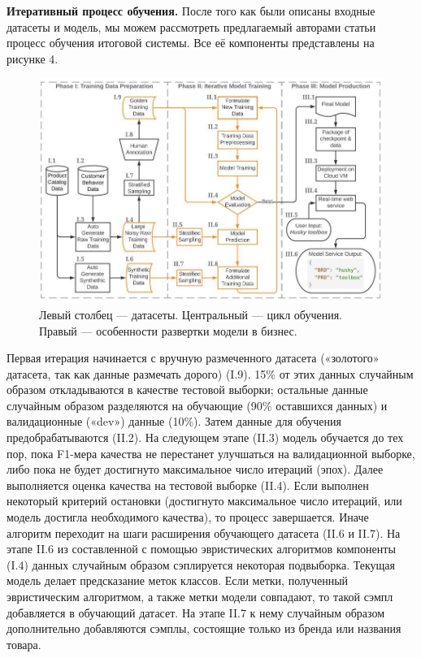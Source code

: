 \documentclass[12pt,a4paper]{article}
\begin{document}
\textbf{Итеративный процесс обучения.} После того как были описаны входные датасеты и модель, мы можем рассмотреть предлагаемый авторами статьи процесс обучения итоговой системы. Все её компоненты представлены на рисунке 4.

\begin{figure}[H]
\begin{center}
  \includegraphics[width=1.0\textwidth]{loop.jpg}
  \caption{Левый столбец --- датасеты. Центральный --- цикл обучения. Правый --- особенности развертки модели в бизнес.}
\end{center}
\end{figure}

\noindent Первая итерация начинается с вручную размеченного датасета («золотого» датасета, так как данные размечать дорого) (I.9). 15\% от этих данных случайным образом откладываются в качестве тестовой выборки; остальные данные случайным образом разделяются на обучающие (90\% оставшихся данных) и валидационные («dev») данные (10\%). Затем данные для обучения предобрабатываются (II.2). На следующем этапе (II.3) модель обучается до тех пор, пока F1-мера качества не перестанет улучшаться на валидационной выборке, либо пока не будет достигнуто максимальное число итераций (эпох). Далее выполняется оценка качества на тестовой выборке (II.4). Если выполнен некоторый критерий остановки (достигнуто максимальное число итераций, или модель достигла необходимого качества), то процесс завершается. Иначе алгоритм переходит на шаги расширения обучающего датасета (II.6 и II.7). На этапе II.6 из составленной с помощью эвристических алгоритмов компоненты (I.4) данных случайным образом сэплируется некоторая подвыборка. Текущая модель делает предсказание меток классов. Если метки, полученный эвристическим алгоритмом, а также метки модели совпадают, то такой сэмпл добавляется в обучающий датасет. На этапе II.7 к нему случайным образом дополнительно добавляются сэмплы, состоящие только из бренда или названия товара. 
\end{document}

